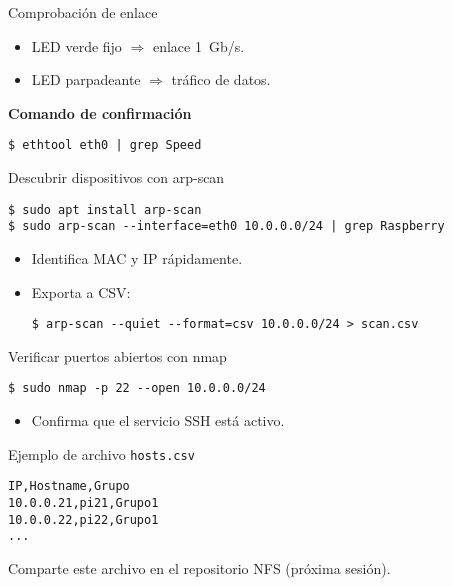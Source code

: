 \documentclass[aspectratio=169,professionalfonts]{beamer}
\begin{document}
\begin{frame}[fragile]{Comprobación de enlace}
  \begin{itemize}
    \item LED verde fijo \(\Rightarrow\) enlace 1 Gb/s.
    \item LED parpadeante \(\Rightarrow\) tráfico de datos.
  \end{itemize}
  \pause
  \textbf{Comando de confirmación}
  \begin{verbatim}
$ ethtool eth0 | grep Speed
  \end{verbatim}
\end{frame}

\begin{frame}[fragile]{Descubrir dispositivos con arp-scan}
  \begin{verbatim}
$ sudo apt install arp-scan
$ sudo arp-scan --interface=eth0 10.0.0.0/24 | grep Raspberry
  \end{verbatim}
  \vspace{0.5em}
  \begin{itemize}
    \item Identifica MAC y IP rápidamente.
    \item Exporta a CSV:
      \begin{verbatim}
$ arp-scan --quiet --format=csv 10.0.0.0/24 > scan.csv
      \end{verbatim}
  \end{itemize}
\end{frame}

\begin{frame}[fragile]{Verificar puertos abiertos con nmap}
  \begin{verbatim}
$ sudo nmap -p 22 --open 10.0.0.0/24
  \end{verbatim}
  \begin{itemize}
    \item Confirma que el servicio SSH está activo.
  \end{itemize}
\end{frame}

\begin{frame}[fragile]{Ejemplo de archivo \texttt{hosts.csv}}
  \begin{verbatim}
IP,Hostname,Grupo
10.0.0.21,pi21,Grupo1
10.0.0.22,pi22,Grupo1
...
  \end{verbatim}
  Comparte este archivo en el repositorio NFS (próxima sesión).
\end{frame}
\end{document}
